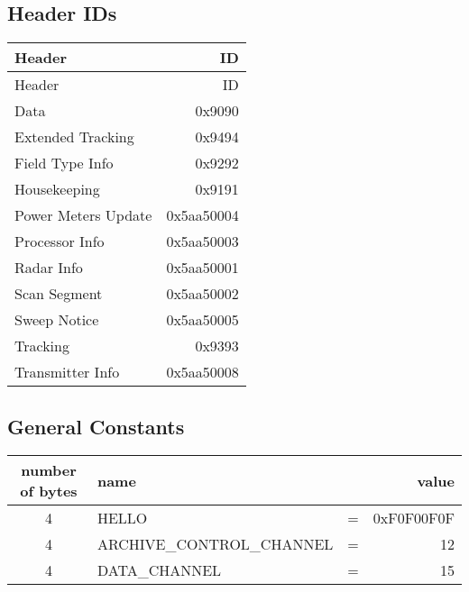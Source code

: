 \documentclass[10pt]{article}
\newcommand{\tblspc}{\rule{0pt}{3ex}}
\begin{document}
\subsection{Header IDs}
\label{sec:header_ids}
\begin{longtable}{|l|r|}
\hline Header & ID \\ \hline \endfirsthead
\hline Header & ID \\ \hline \endhead
\hline \endfoot
\tblspc Data & 0x9090 \\
\hline
\tblspc Extended Tracking & 0x9494 \\
\hline
\tblspc Field Type Info & 0x9292 \\
\hline
\tblspc Housekeeping & 0x9191 \\
\hline
\tblspc Power Meters Update & 0x5aa50004 \\
\hline
\tblspc Processor Info & 0x5aa50003 \\
\hline
\tblspc Radar Info & 0x5aa50001 \\
\hline
\tblspc Scan Segment & 0x5aa50002 \\
\hline
\tblspc Sweep Notice & 0x5aa50005 \\
\hline
\tblspc Tracking & 0x9393 \\
\hline
\tblspc Transmitter Info & 0x5aa50008 \\
\hline
\end{longtable}

\subsection{General Constants}
\label{sec:general_constants}
\begin{tabular}{|c|lcr|}
\hline
number of bytes & name & & value \\
\hline
4 & HELLO & = & 0xF0F00F0F \\
\hline
4 & ARCHIVE\_CONTROL\_CHANNEL & = & 12 \\
\hline
4 & DATA\_CHANNEL & = & 15 \\
\hline
\end{tabular}
\end{document}
